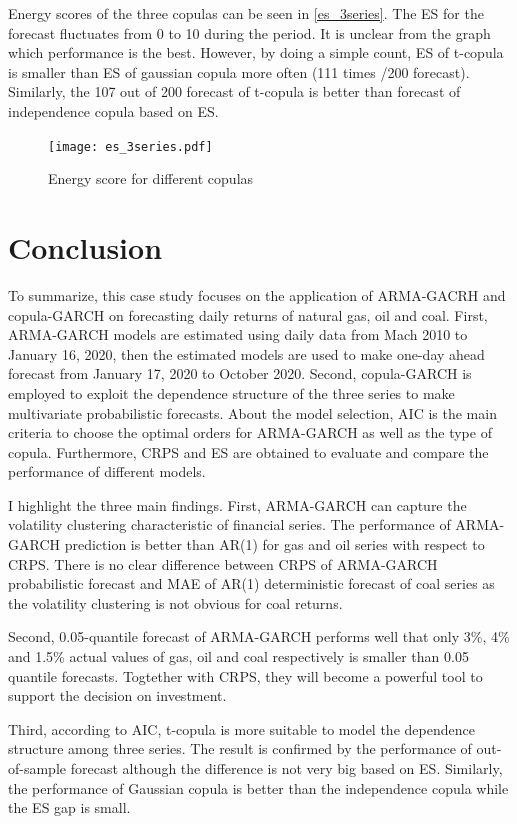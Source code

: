 \documentclass[12pt,a4paper]{article}
\newcommand\colorAutoref[1]{{\hypersetup{linkcolor=black}\autoref{#1}}}
\numberwithin{equation}{section}
\begin{document}
Energy scores of the three copulas can be seen in \colorAutoref{es_3series}. The ES for the forecast fluctuates from 0 to 10 during the period. It is unclear from the graph which performance is the best. However, by doing a simple count, ES of t-copula is smaller than ES of gaussian copula more often (111 times /200 forecast). Similarly, the 107 out of 200 forecast of t-copula is better than forecast of independence copula based on ES.

\vspace{-5mm}
\begin{figure}[h!] 
\texttt{[image: es\_3series.pdf]}
\vspace*{-23mm}
\caption{Energy score for different copulas}
\label{es_3series}
\end{figure}


\newpage
\section{Conclusion}
To summarize, this case study focuses on the application of ARMA-GACRH and copula-GARCH on forecasting daily returns of natural gas, oil and coal. First, ARMA-GARCH models are estimated using daily data from Mach 2010 to January 16, 2020, then the estimated models are used to make one-day ahead forecast from January 17, 2020 to October 2020. Second, copula-GARCH is employed to exploit the dependence structure of the three series to make multivariate probabilistic forecasts. About the model selection, AIC is the main criteria to choose the optimal orders for ARMA-GARCH as well as the type of copula. Furthermore, CRPS and ES are obtained to evaluate and compare the performance of different models.

I highlight the three main findings. First, ARMA-GARCH can capture the volatility clustering characteristic of financial series. The performance of ARMA-GARCH prediction is better than AR(1) for gas and oil series with respect to CRPS. There is no clear difference between CRPS of ARMA-GARCH probabilistic forecast and MAE of AR(1) deterministic forecast of coal series as the volatility clustering is not obvious for coal returns. 

Second, 0.05-quantile forecast of ARMA-GARCH performs well that only 3\%, 4\% and 1.5\% actual values of gas, oil and coal respectively is smaller than 0.05 quantile forecasts. Togtether with CRPS, they will become a powerful tool to support the decision on investment. 

Third, according to AIC, t-copula is more suitable to model the dependence structure among three series. The result is confirmed by the performance of out-of-sample forecast although the difference is not very big based on ES. Similarly, the performance of Gaussian copula is better than the independence copula while the  ES gap is small. 
\end{document}
